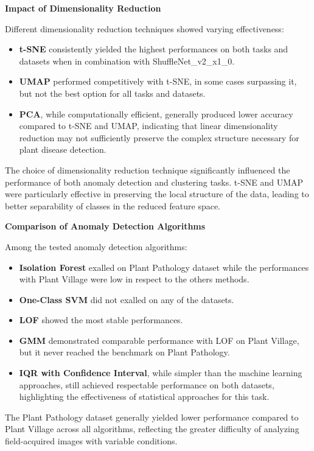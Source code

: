 \documentclass[12pt,a4paper,oneside]{report}
\begin{document}
\textbf{Impact of Dimensionality Reduction}

Different dimensionality reduction techniques showed varying effectiveness:

\begin{itemize}
    \item \textbf{t-SNE} consistently yielded the highest performances on both tasks and datasets when in combination with ShuffleNet\_v2\_x1\_0.
    \item \textbf{UMAP} performed competitively with t-SNE, in some cases surpassing it, but not the best option for all tasks and datasets.
    \item \textbf{PCA}, while computationally efficient, generally produced lower accuracy compared to t-SNE and UMAP, indicating that linear dimensionality reduction may not sufficiently preserve the complex structure necessary for plant disease detection.
\end{itemize}

The choice of dimensionality reduction technique significantly influenced the performance of both anomaly detection and clustering tasks. t-SNE and UMAP were particularly effective in preserving the local structure of the data, leading to better separability of classes in the reduced feature space.

\textbf{Comparison of Anomaly Detection Algorithms}

Among the tested anomaly detection algorithms:

\begin{itemize}
    \item \textbf{Isolation Forest} exalled on Plant Pathology dataset while the performances with Plant Village were low in respect to the others methods.
    \item \textbf{One-Class SVM} did not exalled on any of the datasets.
    \item \textbf{LOF} showed the most stable performances.
    \item \textbf{GMM} demonstrated comparable performance with LOF on Plant Village, but it never reached the benchmark on Plant Pathology.
    \item \textbf{IQR with Confidence Interval}, while simpler than the machine learning approaches, still achieved respectable performance on both datasets, highlighting the effectiveness of statistical approaches for this task.
\end{itemize}

The Plant Pathology dataset generally yielded lower performance compared to Plant Village across all algorithms, reflecting the greater difficulty of analyzing field-acquired images with variable conditions.
\end{document}
